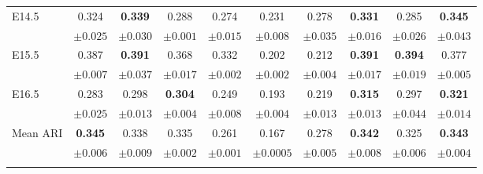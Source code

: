 \begin{tabular}{lccccccccc}
\addlinespace[2pt]
E14.5 & 0.324 & \textbf{0.339} & 0.288 & 0.274 & 0.231 & 0.278 & \textbf{0.331} & 0.285 & \textbf{0.345} \\
 & {\scriptsize $\pm 0.025$} & {\scriptsize $\pm 0.030$} & {\scriptsize $\pm 0.001$} & {\scriptsize $\pm 0.015$} & {\scriptsize $\pm 0.008$} & {\scriptsize $\pm 0.035$} & {\scriptsize $\pm 0.016$} & {\scriptsize $\pm 0.026$} & {\scriptsize $\pm 0.043$} \\
\addlinespace[2pt]
E15.5 & 0.387 & \textbf{0.391} & 0.368 & 0.332 & 0.202 & 0.212 & \textbf{0.391} & \textbf{0.394} & 0.377 \\
 & {\scriptsize $\pm 0.007$} & {\scriptsize $\pm 0.037$} & {\scriptsize $\pm 0.017$} & {\scriptsize $\pm 0.002$} & {\scriptsize $\pm 0.002$} & {\scriptsize $\pm 0.004$} & {\scriptsize $\pm 0.017$} & {\scriptsize $\pm 0.019$} & {\scriptsize $\pm 0.005$} \\
\addlinespace[2pt]
E16.5 & 0.283 & 0.298 & \textbf{0.304} & 0.249 & 0.193 & 0.219 & \textbf{0.315} & 0.297 & \textbf{0.321} \\
 & {\scriptsize $\pm 0.025$} & {\scriptsize $\pm 0.013$} & {\scriptsize $\pm 0.004$} & {\scriptsize $\pm 0.008$} & {\scriptsize $\pm 0.004$} & {\scriptsize $\pm 0.013$} & {\scriptsize $\pm 0.013$} & {\scriptsize $\pm 0.044$} & {\scriptsize $\pm 0.014$} \\
\addlinespace[2pt]
Mean ARI & \textbf{0.345} & 0.338 & 0.335 & 0.261 & 0.167 & 0.278 & \textbf{0.342} & 0.325 & \textbf{0.343} \\
 & {\scriptsize $\pm 0.006$} & {\scriptsize $\pm 0.009$} & {\scriptsize $\pm 0.002$} & {\scriptsize $\pm 0.001$} & {\scriptsize $\pm 0.0005$} & {\scriptsize $\pm 0.005$} & {\scriptsize $\pm 0.008$} & {\scriptsize $\pm 0.006$} & {\scriptsize $\pm 0.004$} \\
\addlinespace[2pt]
\bottomrule
\end{tabular}
